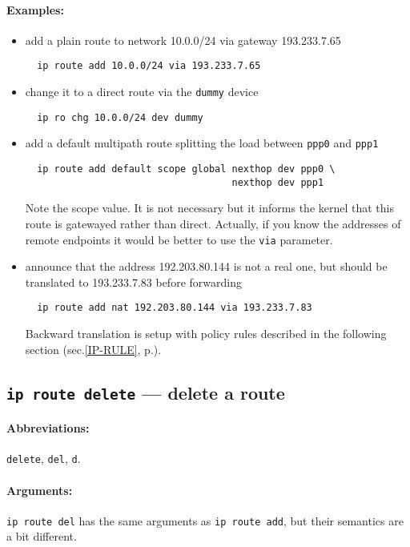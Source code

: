 \paragraph{Examples:}
\begin{itemize}
\item add a plain route to network 10.0.0/24 via gateway 193.233.7.65
\begin{verbatim}
  ip route add 10.0.0/24 via 193.233.7.65
\end{verbatim}
\item change it to a direct route via the \verb|dummy| device
\begin{verbatim}
  ip ro chg 10.0.0/24 dev dummy
\end{verbatim}
\item add a default multipath route splitting the load between \verb|ppp0|
and \verb|ppp1|
\begin{verbatim}
  ip route add default scope global nexthop dev ppp0 \
                                    nexthop dev ppp1
\end{verbatim}
Note the scope value. It is not necessary but it informs the kernel
that this route is gatewayed rather than direct. Actually, if you
know the addresses of remote endpoints it would be better to use the
\verb|via| parameter.
\item announce that the address 192.203.80.144 is not a real one, but
should be translated to 193.233.7.83 before forwarding
\begin{verbatim}
  ip route add nat 192.203.80.144 via 193.233.7.83
\end{verbatim}
Backward translation is setup with policy rules described
in the following section (sec.\ref{IP-RULE}, p.\pageref{IP-RULE}).
\end{itemize}

\subsection{{\tt ip route delete} --- delete a route}

\paragraph{Abbreviations:} \verb|delete|, \verb|del|, \verb|d|.

\paragraph{Arguments:} \verb|ip route del| has the same arguments as
\verb|ip route add|, but their semantics are a bit different.

